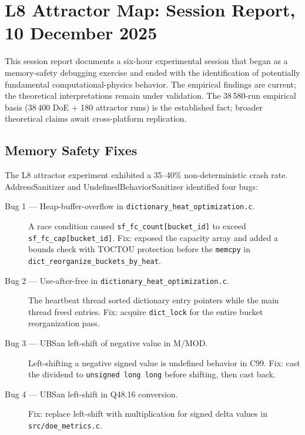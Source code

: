 
\section{L8 Attractor Map: Session Report, 10 December 2025}

This session report documents a six-hour experimental session that began
as a memory-safety debugging exercise and ended with the identification of
potentially fundamental computational-physics behavior. The empirical
findings are current; the theoretical interpretations remain under
validation. The 38\,580-run empirical basis (38\,400 DoE + 180 attractor
runs) is the established fact; broader theoretical claims await
cross-platform replication.

\subsection{Memory Safety Fixes}

The L8 attractor experiment exhibited a 35--40\% non-deterministic crash
rate. AddressSanitizer and UndefinedBehaviorSanitizer identified four
bugs:

\begin{description}
  \item[Bug 1 — Heap-buffer-overflow in \texttt{dictionary\_heat\_optimization.c}.]
        A race condition caused \texttt{sf\_fc\_count[bucket\_id]} to
        exceed \texttt{sf\_fc\_cap[bucket\_id]}. Fix: exposed the capacity
        array and added a bounds check with TOCTOU protection before the
        \texttt{memcpy} in \texttt{dict\_reorganize\_buckets\_by\_heat}.
  \item[Bug 2 — Use-after-free in \texttt{dictionary\_heat\_optimization.c}.]
        The heartbeat thread sorted dictionary entry pointers while the
        main thread freed entries. Fix: acquire \texttt{dict\_lock} for
        the entire bucket reorganization pass.
  \item[Bug 3 — UBSan left-shift of negative value in M/MOD.]
        Left-shifting a negative signed value is undefined behavior in C99.
        Fix: cast the dividend to \texttt{unsigned long long} before
        shifting, then cast back.
  \item[Bug 4 — UBSan left-shift in Q48.16 conversion.]
        Fix: replace left-shift with multiplication for signed delta values
        in \texttt{src/doe\_metrics.c}.
\end{description}

